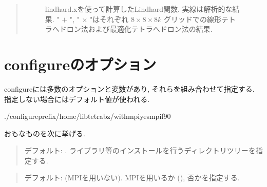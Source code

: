 \documentclass[letterpaper,10pt,dvipdfmx,openany]{sphinxmanual}
\begin{document}
\begin{enumerate}
\begin{quote}
\begin{figure}[htbp]
\centering
\capstart

\noindent{}
\caption{lindhard.xを使って計算したLindhard関数.
実線は解析的な結果.
" \(+\) ", " \(\times\) "はそれぞれ
\(8\times8\times8 k\)
グリッドでの線形テトラへドロン法および最適化テトラへドロン法の結果.}\label{\detokenize{install:id6}}\end{figure}
\end{quote}

\end{enumerate}


\section{configureのオプション}
\label{\detokenize{install:configure}}\label{\detokenize{install:configoption}}
\sphinxAtStartPar
configureには多数のオプションと変数があり, それらを組み合わせて指定する.
指定しない場合にはデフォルト値が使われる.

\begin{sphinxVerbatim}[commandchars=\\\{\}]
\PYGZdl{}./configure\PYGZhy{}\PYGZhy{}prefix/home/libtetrabz/\PYGZhy{}\PYGZhy{}with\PYGZhy{}mpiyesmpif90
\end{sphinxVerbatim}

\sphinxAtStartPar
おもなものを次に挙げる.

\sphinxAtStartPar
{}
\begin{quote}

\sphinxAtStartPar
デフォルト: .
ライブラリ等のインストールを行うディレクトリツリーを指定する.
\end{quote}

\sphinxAtStartPar
{}
\begin{quote}

\sphinxAtStartPar
デフォルト:  (MPIを用いない).
MPIを用いるか (), 否かを指定する.
\end{quote}
\end{document}

